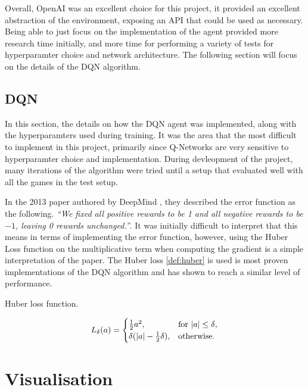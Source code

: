 Overall, OpenAI was an excellent choice for this project, it provided an excellent abstraction of the environment, exposing an API that could be used as necessary. Being able to just focus on the implementation of the agent provided more research time initially, and more time for performing a variety of tests for hyperparamter choice and network architecture. The following section will focus on the details of the DQN algorithm.

\subsection{DQN}
In this section, the details on how the DQN agent was implemented, along with the hyperparamters used during training. It was the area that the most difficult to implement in this project, primarily since Q-Networks are very sensitive to hyperparamter choice and implementation. During devleopment of the project, many iterations of the algorithm were tried until a setup that evaluated well with all the games in the test setup.

In the 2013 paper authored by DeepMind \cite{dqn}, they described the error function as the following. \textit{``We fixed all positive rewards to be 1 and all negative rewards to be $-1$, leaving 0 rewards unchanged.''}. It was initially difficult to interpret that this means in terms of implementing the error function, however, using the Huber Loss function on the multiplicative term when computing the gradient is a simple interpretation of the paper. The Huber loss \ref{def:huber} is used is most proven implementations of the DQN algorithm and has shown to reach a similar level of performance.

\begin{defn}
  Huber loss function.

  \begin{equation}
    L_\delta(a)=\begin{cases}
      \frac{1}{2}a^2,                      & \text{for $\abs{a} \leq \delta$}, \\
      \delta(\abs{a} - \frac{1}{2}\delta), & \text{otherwise}.
    \end{cases}
  \end{equation}
  \label{def:huber}
\end{defn}



\section{Visualisation}